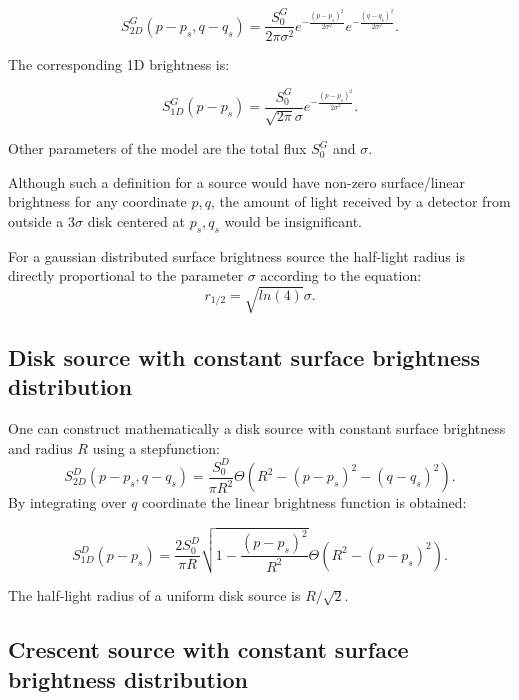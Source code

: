 \begin{equation}
 S_{2D}^G(p-p_s, q-q_s) = \frac{S_0^G}{2 \pi \sigma^2} e^{-\frac{(p-p_s)^2}{2 \sigma^2}} e^{-\frac{(q-q_s)^2}{2 \sigma^2}}.
\end{equation}

The corresponding 1D brightness is:

\begin{equation}
 S_{1D}^G(p-p_s) = \frac{S_0^G}{\sqrt{2 \pi} \sigma} e^{-\frac{(p-p_s)^2}{2 \sigma^2}}.
\end{equation}

Other parameters of the model are the total flux $S_0^G$ and $\sigma$. 

Although such a definition for a source would have non-zero surface/linear brightness for any coordinate $p,q$, the amount of light received by a detector from outside a $3 \sigma$ disk centered at $p_s, q_s$ 
would be insignificant.

For a gaussian distributed surface brightness source the half-light radius is directly proportional to the parameter $\sigma$ according to the equation:
\begin{equation}
r_{1/2} = \sqrt{ln(4)} \sigma.
\end{equation}

\subsection{Disk source with constant surface brightness distribution}

One can construct mathematically a disk source with constant surface brightness and radius $R$ using a stepfunction:
\begin{equation}
 S_{2D}^D(p-p_s, q-q_s) = \frac{S_0^D}{\pi R^2} \Theta \left( R^2 - \left( p-p_s \right)^2 - \left( q-q_s \right)^2 \right).
\end{equation}
By integrating over $q$ coordinate the linear brightness function is obtained:


\begin{equation}
 S_{1D}^D(p-p_s) = \frac{2 S_0^D}{\pi R}  \sqrt{1 - \frac{(p-p_s)^2}{R^2} }    \Theta \left( R^2 - \left( p-p_s \right)^2 \right).
\end{equation}

The half-light radius of a uniform disk source is $R/\sqrt{2}$.

\subsection{Crescent source with constant surface brightness distribution}

